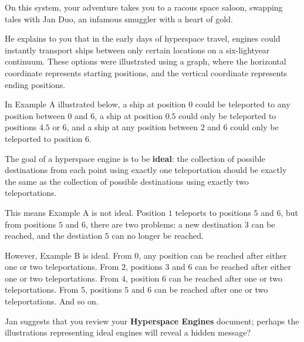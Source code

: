 On this system, your adventure takes you to a racous space saloon, swapping tales
with Jan Duo, an infamous smuggler with a heart of gold.

He explains to you that in the early days of hyperspace travel, engines could
instantly transport ships between only certain locations on a six-lightyear continuum.
These options were illustrated using a graph, where the horizontal coordinate
represents starting positions, and the vertical coordinate represents ending positions.

In Example A illustrated below, a ship at position \(0\) could be teleported
to any position between \(0\) and \(6\), a ship at position \(0.5\) could only
be teleported to positions \(4.5\) or \(6\), and a ship at any position between
\(2\) and \(6\) could only be teleported to position \(6\).

The goal of a hyperspace engine is to be \textbf{ideal}: the collection of possible
destinations from each point using exactly one teleportation should be exactly the 
same as the collection of possible destinations using exactly two teleportations.

This means Example A is not ideal. Position \(1\) teleports to
positions \(5\) and \(6\), but from positions \(5\) and \(6\), there are two
problems: a new destination \(3\) can be reached, and the destiation \(5\) can
no longer be reached.

However, Example B is ideal. From \(0\), any position can be reached after either
one or two teleportations. From \(2\), positions \(3\) and \(6\) can be reached
after either one or two teleportations. From \(4\), position \(6\) can be reached
after one or two teleportations. From \(5\), positions \(5\) and \(6\) can be
reached after one or two teleportations. And so on.

Jan suggests that you review your \textbf{Hyperspace Engines} document;
perhaps the illustrations representing ideal engines will reveal a hidden message?


